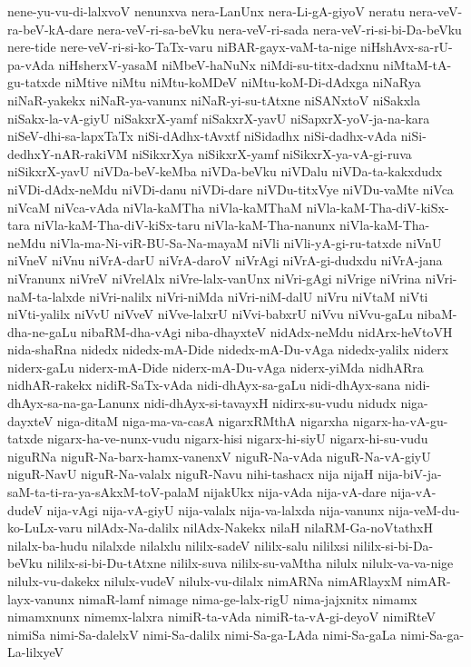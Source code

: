 {nene-yu-vu-di-lalxvoV
nenunxva
nera-LanUnx
nera-Li-gA-giyoV
neratu
nera-veV-ra-beV-kA-dare
nera-veV-ri-sa-beVku
nera-veV-ri-sada
nera-veV-ri-si-bi-Da-beVku
nere-tide
nere-veV-ri-si-ko-TaTx-varu
niBAR-gayx-vaM-ta-nige
niHshAvx-sa-rU-pa-vAda
niHsherxV-yasaM
niMbeV-haNuNx
niMdi-su-titx-dadxnu
niMtaM-tA-gu-tatxde
niMtive
niMtu
niMtu-koMDeV
niMtu-koM-Di-dAdxga
niNaRya
niNaR-yakekx
niNaR-ya-vanunx
niNaR-yi-su-tAtxne
niSANxtoV
niSakxla
niSakx-la-vA-giyU
niSakxrX-yamf
niSakxrX-yavU
niSapxrX-yoV-ja-na-kara
niSeV-dhi-sa-lapxTaTx
niSi-dAdhx-tAvxtf
niSidadhx
niSi-dadhx-vAda
niSi-dedhxY-nAR-rakiVM
niSikxrXya
niSikxrX-yamf
niSikxrX-ya-vA-gi-ruva
niSikxrX-yavU
niVDa-beV-keMba
niVDa-beVku
niVDalu
niVDa-ta-kakxdudx
niVDi-dAdx-neMdu
niVDi-danu
niVDi-dare
niVDu-titxVye
niVDu-vaMte
niVca
niVcaM
niVca-vAda
niVla-kaMTha
niVla-kaMThaM
niVla-kaM-Tha-diV-kiSx-tara
niVla-kaM-Tha-diV-kiSx-taru
niVla-kaM-Tha-nanunx
niVla-kaM-Tha-neMdu
niVla-ma-Ni-viR-BU-Sa-Na-mayaM
niVli
niVli-yA-gi-ru-tatxde
niVnU
niVneV
niVnu
niVrA-darU
niVrA-daroV
niVrAgi
niVrA-gi-dudxdu
niVrA-jana
niVranunx
niVreV
niVrelAlx
niVre-lalx-vanUnx
niVri-gAgi
niVrige
niVrina
niVri-naM-ta-lalxde
niVri-nalilx
niVri-niMda
niVri-niM-dalU
niVru
niVtaM
niVti
niVti-yalilx
niVvU
niVveV
niVve-lalxrU
niVvi-babxrU
niVvu
niVvu-gaLu
nibaM-dha-ne-gaLu
nibaRM-dha-vAgi
niba-dhayxteV
nidAdx-neMdu
nidArx-heVtoVH
nida-shaRna
nidedx
nidedx-mA-Dide
nidedx-mA-Du-vAga
nidedx-yalilx
niderx
niderx-gaLu
niderx-mA-Dide
niderx-mA-Du-vAga
niderx-yiMda
nidhARra
nidhAR-rakekx
nidiR-SaTx-vAda
nidi-dhAyx-sa-gaLu
nidi-dhAyx-sana
nidi-dhAyx-sa-na-ga-Lanunx
nidi-dhAyx-si-tavayxH
nidirx-su-vudu
nidudx
niga-dayxteV
niga-ditaM
niga-ma-va-casA
nigarxRMthA
nigarxha
nigarx-ha-vA-gu-tatxde
nigarx-ha-ve-nunx-vudu
nigarx-hisi
nigarx-hi-siyU
nigarx-hi-su-vudu
niguRNa
niguR-Na-barx-hamx-vanenxV
niguR-Na-vAda
niguR-Na-vA-giyU
niguR-NavU
niguR-Na-valalx
niguR-Navu
nihi-tashacx
nija
nijaH
nija-biV-ja-saM-ta-ti-ra-ya-sAkxM-toV-palaM
nijakUkx
nija-vAda
nija-vA-dare
nija-vA-dudeV
nija-vAgi
nija-vA-giyU
nija-valalx
nija-va-lalxda
nija-vanunx
nija-veM-du-ko-LuLx-varu
nilAdx-Na-dalilx
nilAdx-Nakekx
nilaH
nilaRM-Ga-noVtathxH
nilalx-ba-hudu
nilalxde
nilalxlu
nililx-sadeV
nililx-salu
nililxsi
nililx-si-bi-Da-beVku
nililx-si-bi-Du-tAtxne
nililx-suva
nililx-su-vaMtha
nilulx
nilulx-va-va-nige
nilulx-vu-dakekx
nilulx-vudeV
nilulx-vu-dilalx
nimARNa
nimARlayxM
nimAR-layx-vanunx
nimaR-lamf
nimage
nima-ge-lalx-rigU
nima-jajxnitx
nimamx
nimamxnunx
nimemx-lalxra
nimiR-ta-vAda
nimiR-ta-vA-gi-deyoV
nimiRteV
nimiSa
nimi-Sa-dalelxV
nimi-Sa-dalilx
nimi-Sa-ga-LAda
nimi-Sa-gaLa
nimi-Sa-ga-La-lilxyeV
}
